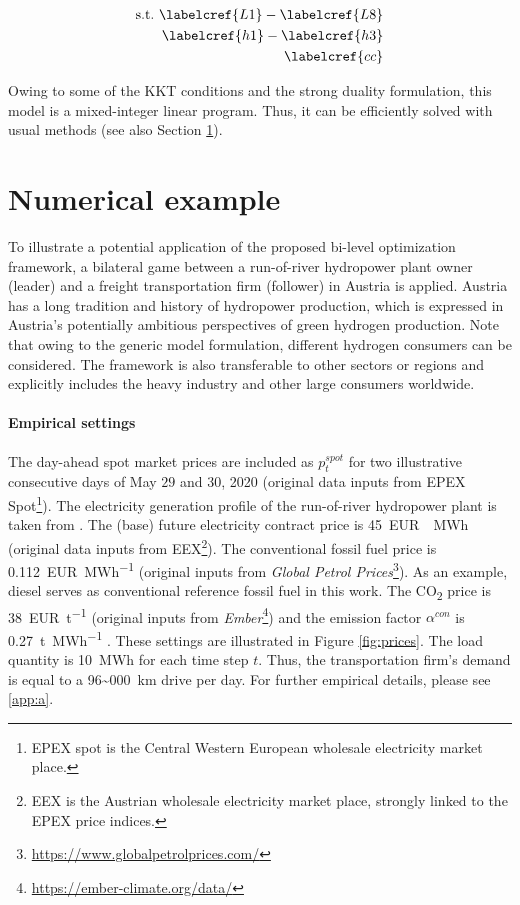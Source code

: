 \documentclass[review]{elsarticle}
\begin{document}
\begin{align}\label{bi_2}
\begin{aligned}
\mathrm{s.t.~} \labelcref{L1}-\labelcref{L8}\\
\labelcref{h1}-\labelcref{h3}\\ 
\labelcref{cc}
\end{aligned}
\end{align}

Owing to some of the KKT conditions and the strong duality formulation, this model is a mixed-integer linear program. Thus, it can be efficiently solved with usual methods (see also Section \ref{numerical}).

\section{Numerical example}\label{numerical}
To illustrate a potential application of the proposed bi-level optimization framework, a bilateral game between a run-of-river hydropower plant owner (leader) and a freight transportation firm (follower) in Austria is applied. Austria has a long tradition and history of hydropower production, which is expressed in Austria's potentially ambitious perspectives of green hydrogen production. Note that owing to the generic model formulation, different hydrogen consumers can be considered. The framework is also transferable to other sectors or regions and explicitly includes the heavy industry and other large consumers worldwide. 

\paragraph{Empirical settings} The day-ahead spot market prices are included as $p_{t}^{spot}$ for two illustrative consecutive days of May $29$ and 30, 2020 \cite{EEG} (original data inputs from  EPEX Spot\footnote{EPEX spot is the Central Western European wholesale electricity market place.}). The electricity generation profile of the run-of-river hydropower plant is taken from \cite{EEG}. The (base) future electricity contract price is \SI{45}{EUR \per MWh} \cite{EEG} (original data inputs from EEX\footnote{EEX is the Austrian wholesale electricity market place, strongly linked to the EPEX price indices.}). The conventional fossil fuel price is \SI{0.112}{EUR\per MWh} \cite{EEG} (original inputs from \textit{Global Petrol Prices}\footnote{\url{https://www.globalpetrolprices.com/}}). As an example, diesel serves as conventional reference fossil fuel in this work. The CO\textsubscript{2} price is \SI{38}{EUR\per t} \cite{EEG} (original inputs from \textit{Ember}\footnote{\url{https://ember-climate.org/data/}}) and the emission factor $\alpha^{con}$ is \SI{0.27}{\tonne \per MWh} \cite{EEG}. These settings are illustrated in Figure \ref{fig:prices}. The load quantity is \SI{10}{MWh} for each time step $t$. Thus, the transportation firm's demand is equal to a \SI{96~000}{km} drive per day. For further empirical details, please see \ref{app:a}.
\end{document}
